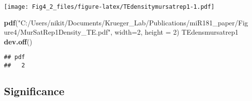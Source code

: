 \documentclass[
]{article}
\newenvironment{Shaded}{\begin{snugshade}}{\end{snugshade}}
\newcommand{\AttributeTok}[1]{\textcolor[rgb]{0.13,0.29,0.53}{#1}}
\newcommand{\DecValTok}[1]{\textcolor[rgb]{0.00,0.00,0.81}{#1}}
\newcommand{\FunctionTok}[1]{\textcolor[rgb]{0.13,0.29,0.53}{\textbf{#1}}}
\newcommand{\NormalTok}[1]{#1}
\newcommand{\StringTok}[1]{\textcolor[rgb]{0.31,0.60,0.02}{#1}}
\begin{document}
\texttt{[image: Fig4\_2\_files/figure-latex/TEdensitymursatrep1-1.pdf]}

\begin{Shaded}
\begin{Highlighting}[]
\FunctionTok{pdf}\NormalTok{(}\StringTok{"C:/Users/nikit/Documents/Krueger\_Lab/Publications/miR181\_paper/Figure4/MurSatRep1Density\_TE.pdf"}\NormalTok{, }\AttributeTok{width=}\DecValTok{2}\NormalTok{, }\AttributeTok{height =} \DecValTok{2}\NormalTok{)}
\NormalTok{TEdensmursatrep1}
\FunctionTok{dev.off}\NormalTok{()}
\end{Highlighting}
\end{Shaded}

\begin{verbatim}
## pdf 
##   2
\end{verbatim}

\hypertarget{significance-8}{%
\subsection{Significance}\label{significance-8}}
\end{document}
